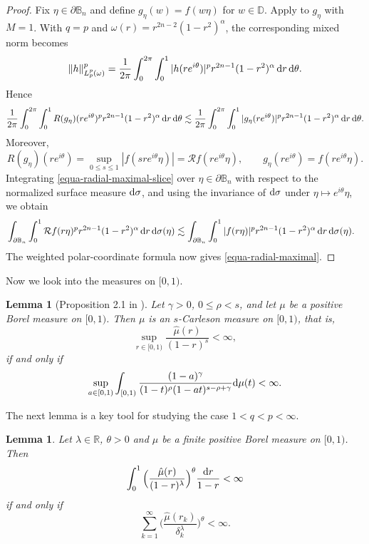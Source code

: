 \documentclass[preprint,12pt,times]{elsarticle}
\newtheorem{lemma}[theorem]{Lemma}
\theoremstyle{definition}
\theoremstyle{remark}
\numberwithin{equation}{section}
\begin{document}
\begin{proof}
Fix $\eta\in\partial\mathbb B_n$ and define $g_\eta(w)=f(w\eta)$ for $w\in\mathbb D$. Apply \cite[Theorem~2.1]{AguilarHernandezMasPelaezRattya2026} to $g_\eta$ with $M=1$. With $q=p$ and $\omega(r)=r^{2n-2}(1-r^2)^\alpha$, the corresponding mixed norm becomes
\[
\|h\|_{L_p^p(\omega)}^p
=\frac{1}{2\pi}\int_0^{2\pi}\int_0^1
|h(re^{i\theta})|^p r^{2n-1}(1-r^2)^\alpha
\,{\rm d}r\,{\rm d}\theta.
\]
Hence
\begin{equation}\label{equa-radial-maximal-slice}
\frac{1}{2\pi}\int_0^{2\pi}\int_0^1
R(g_\eta)(re^{i\theta})^p r^{2n-1}(1-r^2)^\alpha
\,{\rm d}r\,{\rm d}\theta
\lesssim
\frac{1}{2\pi}\int_0^{2\pi}\int_0^1
|g_\eta(re^{i\theta})|^p r^{2n-1}(1-r^2)^\alpha
\,{\rm d}r\,{\rm d}\theta.
\end{equation}
Moreover,
\[
R(g_\eta)(re^{i\theta})
=\sup_{0\le s\le1}|f(sre^{i\theta}\eta)|
=\mathcal Rf(re^{i\theta}\eta),
\qquad
g_\eta(re^{i\theta})=f(re^{i\theta}\eta).
\]
Integrating \eqref{equa-radial-maximal-slice} over $\eta\in\partial\mathbb B_n$ with respect to the normalized surface measure ${\rm d}\sigma$, and using the invariance of ${\rm d}\sigma$ under $\eta\mapsto e^{i\theta}\eta$, we obtain
\[
\begin{aligned}
  &\int_{\partial\mathbb B_n}\int_0^1\mathcal Rf(r\eta)^p
    r^{2n-1}(1-r^2)^\alpha\,{\rm d}r\,{\rm d}\sigma(\eta) \lesssim
    \int_{\partial\mathbb B_n}\int_0^1|f(r\eta)|^p
    r^{2n-1}(1-r^2)^\alpha\,{\rm d}r\,{\rm d}\sigma(\eta).
\end{aligned}
\]
The weighted polar-coordinate formula now gives
\eqref{equa-radial-maximal}.
\end{proof}


 Now we look into the measures on $[0,1)$.

\begin{lemma}[Proposition 2.1 in \cite{BaoSunWulan2022}]  \label{lemma2.6}
Let $\gamma>0$, $0\leq\rho<s$, and let $\mu$ be a positive Borel measure on $[0,1)$. Then $\mu$ is an $s$-Carleson measure on $[0,1)$, that is,
\[
    \sup_{r\in [0,1)}\frac{\hat{\mu}(r)}{(1-r)^{s}}<\infty,
\]
if and only if
\[
    \sup_{a\in [0,1)}\int_{[0,1)}\frac{(1-a)^{\gamma}}{(1-t)^\rho(1-at)^{s-\rho+\gamma}}{\rm d}\mu(t)<\infty.
\]
\end{lemma}

The next lemma is a key tool for studying the case $1<q<p<\infty$.
\begin{lemma}  \label{lemma2.7}
  Let $\lambda\in\mathbb{R}$, $\theta>0$ and $\mu$ be a finite positive Borel measure on $[0,1)$. Then
\begin{equation}\label{equa2.1}
\int_{0}^1\Big(\frac{\hat{\mu}(r)}{(1-r)^{\lambda}}\Big)^{\theta}\frac{{\rm d}r}{1-r}<\infty
\end{equation}
if and only if 
\begin{equation}\label{equa2.2}
\sum_{k=1}^{\infty}\Big(\frac{\hat{\mu}(r_k)}{\delta_k^{\lambda}}\Big)^{\theta}<\infty.
\end{equation}
\end{lemma}
\end{document}
